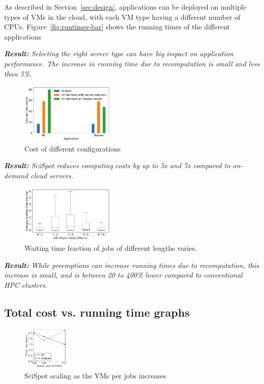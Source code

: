 As described in Section~\ref{sec:design}, applications can be deployed on multiple types of VMs in the cloud, with each VM type having a different number of CPUs. 
Figure~\ref{fig:runtimes-bar} shows the running times of the different applications 

\noindent \emph{ \textbf{Result:} Selecting the right server type can have big impact on application performance. The increase in running time due to recomputation is small and less than 5\%.}



\begin{figure}
  \centering
  \includegraphics[width=0.4\textwidth]{../graphs/cost-only-bar.pdf}
  \caption{Cost of different configurations}
  \label{fig:cost-only-bar}
\end{figure}

\noindent \emph{ \textbf{Result:} SciSpot reduces computing costs by up to 5x and 7x compared to on-demand cloud servers.}

\begin{figure}
  \includegraphics[width=0.4\textwidth]{../graphs/waiting_time_buckets.pdf}
  \caption{Waiting time fraction of jobs of different lengths varies.}
  \label{fig:hpc-wait-buckets}  
\end{figure}

\noindent \emph{ \textbf{Result:} While preemptions can increase running times due to recomputation, this increase is small, and is between 20 to 400\% lower compared to conventional HPC clusters. }

\subsection{Total cost vs. running time graphs}

\begin{figure}
  \includegraphics[width=0.2\textwidth]{../graphs/vm-per-job-scaling.pdf}
  \caption{SciSpot scaling as the VMs per jobs increases}
  \label{fig:vm-per-job-scaling}
\end{figure}

